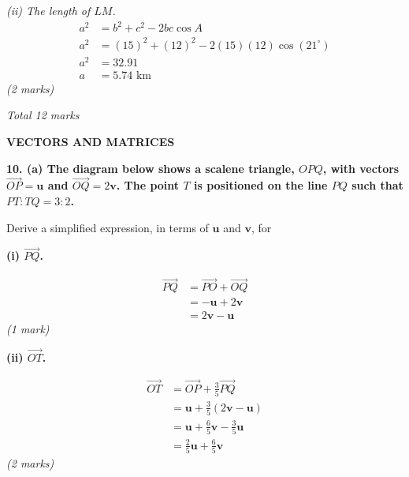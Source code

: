 \documentclass[12pt,a4paper]{article}
\newcommand{\qhead}[1]{\vspace{0.6em}\noindent\textbf{\large #1}\par\vspace{0.3em}}
\newcommand{\subhead}[1]{\vspace{0.3em}\noindent\textbf{#1}\par}
\newcommand{\qmarks}[1]{\hfill\textit{(#1)}}
\begin{document}
\textit{(ii) The length of $LM$.}
\begin{align*}
a^2 &= b^2 + c^2 - 2bc\cos A \\
a^2 &= (15)^2 + (12)^2 - 2(15)(12)\cos(21^{\circ}) \\
a^2 &= 32.91 \\
a &= 5.74 \text{ km}
\end{align*}
\qmarks{2 marks}

\hfill\textit{Total 12 marks}

\newpage
\begin{center}
\textbf{VECTORS AND MATRICES}
\end{center}

\qhead{10. (a) The diagram below shows a scalene triangle, $OPQ$, with vectors $\vec{OP} = \mathbf{u}$ and $\vec{OQ} = 2\mathbf{v}$. The point $T$ is positioned on the line $PQ$ such that $PT:TQ = 3:2$.}

\begin{center}
\end{center}

Derive a simplified expression, in terms of $\mathbf{u}$ and $\mathbf{v}$, for

\subhead{(i) $\vec{PQ}$.}
\begin{align*}
\vec{PQ} &= \vec{PO} + \vec{OQ} \\
&= -\mathbf{u} + 2\mathbf{v} \\
&= 2\mathbf{v} - \mathbf{u}
\end{align*}
\qmarks{1 mark}

\subhead{(ii) $\vec{OT}$.}
\begin{align*}
\vec{OT} &= \vec{OP} + \tfrac{3}{5}\vec{PQ} \\
&= \mathbf{u} + \tfrac{3}{5}(2\mathbf{v} - \mathbf{u}) \\
&= \mathbf{u} + \tfrac{6}{5}\mathbf{v} - \tfrac{3}{5}\mathbf{u} \\
&= \tfrac{2}{5}\mathbf{u} + \tfrac{6}{5}\mathbf{v}
\end{align*}
\qmarks{2 marks}
\end{document}
